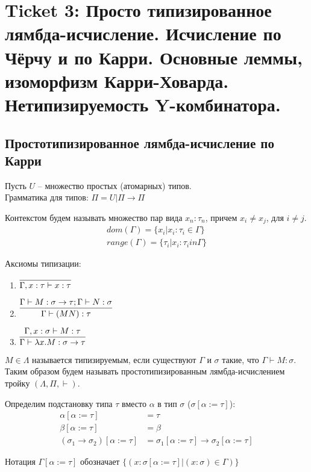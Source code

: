 \section{Ticket 3: Просто типизированное лямбда-исчисление. Исчисление по Чёрчу и по Карри.
Основные леммы, изоморфизм Карри-Ховарда. Нетипизируемость Y-комбинатора.}
\label{sec-4}
\subsection{Простотипизированное лямбда-исчисление по Карри}
\label{sec-4-1}
Пусть $U$ -- множество простых (атомарных) типов. \\
Грамматика для типов: $\Pi = U | \Pi \rightarrow \Pi$

Контекстом будем называть множество пар вида $x_n:\tau_n$, причем $x_i \not =
x_j$, для $i \not = j$.
\begin{align*}
dom(\Gamma) = \{ x_i | x_i:\tau_i \in \Gamma \} \\
range(\Gamma) = \{ \tau_i | x_i:\tau_i in \Gamma \}
\end{align*}

Аксиомы типизации:

\begin{enumerate}
\item
$\infer{\Gamma, x:\tau \vdash x:\tau}{}$
\item
$\infer{\Gamma \vdash (M N):\tau}{\Gamma \vdash M: \sigma \rightarrow
\tau; \Gamma \vdash N: \sigma}$
\item
$\infer{\Gamma \vdash \lambda x. M: \sigma \rightarrow \tau}{\Gamma, x:\sigma \vdash M:\tau}$
\end{enumerate}

$M \in \Lambda$ называется типизируемым, если существуют $\Gamma$ и $\sigma$
такие, что $\Gamma \vdash M:\sigma$. Таким образом будем называть простотипизированным лямбда-исчислением тройку
$(\Lambda, \Pi, \vdash)$.

Определим подстановку типа $\tau$ вместо $\alpha$ в тип $\sigma$
($\sigma[\alpha:=\tau]$):
\begin{align*}
\alpha[\alpha:=\tau] &= \tau \\
\beta[\alpha:=\tau] &= \beta \\
(\sigma_1 \rightarrow \sigma_2)[\alpha:=\tau] &= \sigma_1[\alpha:=\tau] \rightarrow \sigma_2[\alpha:=\tau]
\end{align*}

Нотация $\Gamma[\alpha:=\tau]$ обозначает $\{ (x:\sigma[\alpha:=\tau] |
(x:\sigma) \in \Gamma) \}$

